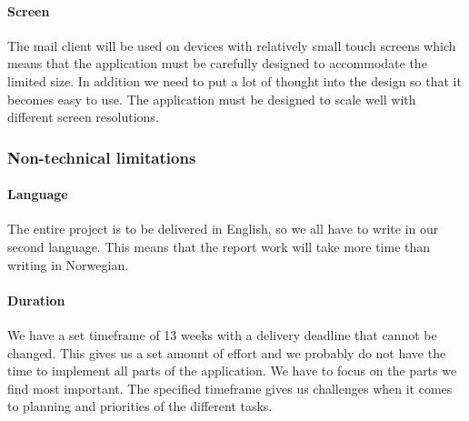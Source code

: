 \paragraph{Screen}\hfill
\newline
The mail client will be used on devices with relatively small touch screens which means that the application must be carefully designed to accommodate the limited size. In addition we need to put a lot of thought into the design so that it becomes easy to use. The application must be designed to scale well with different screen resolutions.

\subsubsection{Non-technical limitations}

\paragraph{Language}\hfill
\newline
The entire project is to be delivered in English, so we all have to write in our second language. This means that the report work will take more time than writing in Norwegian. 

\paragraph{Duration}\hfill
\newline
We have a set timeframe of 13 weeks with a delivery deadline that cannot be changed. This gives us a set amount of effort and we probably do not have the time to implement all parts of the application. We have to focus on the parts we find most important. The specified timeframe gives us challenges when it comes to planning and priorities of the different tasks.
